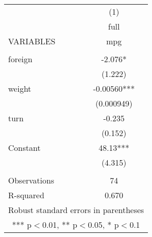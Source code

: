 \documentclass[]{article}
\begin{document}
\begin{tabular}{lc} \hline
 & (1) \\
 & full \\
VARIABLES & mpg \\ \hline
 &  \\
foreign & -2.076* \\
 & (1.222) \\
weight & -0.00560*** \\
 & (0.000949) \\
turn & -0.235 \\
 & (0.152) \\
Constant & 48.13*** \\
 & (4.315) \\
 &  \\
Observations & 74 \\
 R-squared & 0.670 \\ \hline
\multicolumn{2}{c}{ Robust standard errors in parentheses} \\
\multicolumn{2}{c}{ *** p$<$0.01, ** p$<$0.05, * p$<$0.1} \\
\end{tabular}
\end{document}
